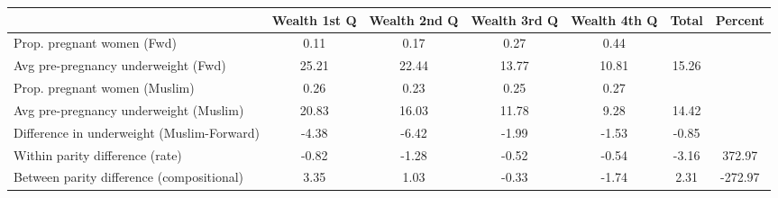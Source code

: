 \begin{tabular}{l*{6}{c}}
\toprule
            &\multicolumn{1}{c}{Wealth 1st Q}&\multicolumn{1}{c}{Wealth 2nd Q}&\multicolumn{1}{c}{Wealth 3rd Q}&\multicolumn{1}{c}{Wealth 4th Q}&\multicolumn{1}{c}{Total}&\multicolumn{1}{c}{Percent}\\
\midrule
\midrule
Prop. pregnant women (Fwd)&        0.11&        0.17&        0.27&        0.44&            &            \\
Avg pre-pregnancy underweight (Fwd)&       25.21&       22.44&       13.77&       10.81&       15.26&            \\
Prop. pregnant women (Muslim)&        0.26&        0.23&        0.25&        0.27&            &            \\
Avg pre-pregnancy underweight (Muslim)&       20.83&       16.03&       11.78&        9.28&       14.42&            \\
Difference in underweight (Muslim-Forward)&       -4.38&       -6.42&       -1.99&       -1.53&       -0.85&            \\
Within parity difference (rate)&       -0.82&       -1.28&       -0.52&       -0.54&       -3.16&      372.97\\
Between parity difference (compositional)&        3.35&        1.03&       -0.33&       -1.74&        2.31&     -272.97\\
\bottomrule
\end{tabular}
